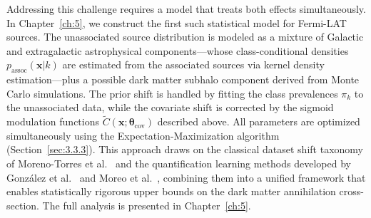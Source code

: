 Addressing this challenge requires a model that treats both effects simultaneously.
In Chapter~\ref{ch:5}, we construct the first such statistical model for Fermi-LAT sources.
The unassociated source distribution is modeled as a mixture of Galactic and extragalactic astrophysical components---whose class-conditional densities $p_{\text{assoc}}(\mathbf{x}|k)$ are estimated from the associated sources via kernel density estimation---plus a possible dark matter subhalo component derived from Monte Carlo simulations.
The prior shift is handled by fitting the class prevalences $\pi_k$ to the unassociated data, while the covariate shift is corrected by the sigmoid modulation functions $\tilde{C}(\mathbf{x};\boldsymbol{\theta}_{\text{cov}})$ described above.
All parameters are optimized simultaneously using the Expectation-Maximization algorithm (Section~\ref{sec:3.3.3}).
This approach draws on the classical dataset shift taxonomy of Moreno-Torres et al.~\cite{MorenoTorres2012AUV} and the quantification learning methods developed by Gonz\'alez et al.~\cite{10.1145/3117807_Gonzalez_quantification} and Moreo et al.~\cite{2024arXiv240100490M}, combining them into a unified framework that enables statistically rigorous upper bounds on the dark matter annihilation cross-section.
The full analysis is presented in Chapter~\ref{ch:5}.
